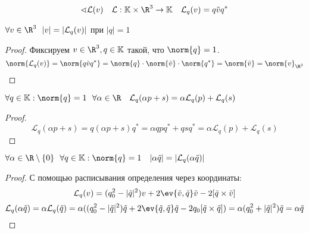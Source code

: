 \[\sphericalangle \mathcal{L}(v) \quad \mathcal{L} : \mathbb{K} \times \R^3 \to \mathbb{K} \quad \mathcal{L}_q(v) = q \tilde{v} q^*\]

\begin{lemma}
	\(\forall v \in \R^3 \ \ |v| = |\mathcal{L}_q(v)|\) при \(|q| = 1\)
\end{lemma}
\begin{proof}
	Фиксируем \(v \in \R^3, q \in \mathbb{K}\) такой, что \(\norm{q} = 1\).
	\[\norm{\mathcal{L}_q(v)} = \norm{q \tilde{v} q^*} = \norm{q} \cdot \norm{\tilde{v}} \cdot \norm{q^*} = \norm{\tilde{v}} = \norm{v}_{\R^3}\]
\end{proof}

\begin{lemma}
	\(\forall q \in \mathbb{K} : \norm{q} = 1 \ \
	\forall \alpha \in \R \quad \mathcal{L}_q(\alpha p + s) = \alpha \mathcal{L}_q(p) + \mathcal{L}_q(s)\)
\end{lemma}
\begin{proof}
	\[
		\mathcal{L}_q(\alpha p + s) = q (\alpha p + s) q^* =
		\alpha q p q^* + q s q^* = \alpha \mathcal{L}_q(p) + \mathcal{L}_q(s)
	\]
\end{proof}

\begin{lemma}
	\(\forall \alpha \in \R \setminus \{0\} \ \ \forall q \in \mathbb{K} : \norm{q} = 1 \quad |\alpha \tilde{q}| = |\mathcal{L}_q(\alpha \tilde{q})|\)
\end{lemma}
\begin{proof}
	С помощью расписывания определения через координаты:
	\[\mathcal{L}_q(v) = (q_0^2 - |\tilde{q}|^2)v + 2 \ev{\tilde{v}, \tilde{q}} \tilde{v} - 2 [\tilde{q} \times \tilde{v}]\]
	\[\mathcal{L}_q(\alpha \tilde{q}) = \alpha \mathcal{L}_q(\tilde{q})
		= \alpha ((q_0^2 - |\tilde{q}|^2)\tilde{q} + 2 \ev{\tilde{q}, \tilde{q}} \tilde{q} - 2 q_0[\tilde{q} \times \tilde{q}])
		= \alpha (q_0^2 + |\tilde{q}|^2) \tilde{q} = \alpha \tilde{q}\]
\end{proof}

